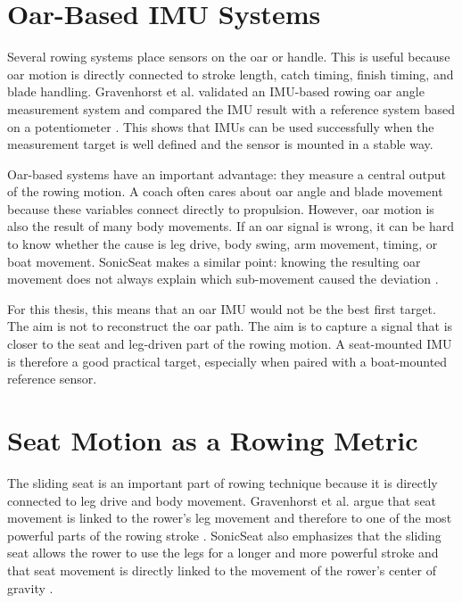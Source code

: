 \section{Oar-Based IMU Systems}

Several rowing systems place sensors on the oar or handle. This is useful because oar motion is directly connected to stroke length, catch timing, finish timing, and blade handling. Gravenhorst et al. validated an IMU-based rowing oar angle measurement system and compared the IMU result with a reference system based on a potentiometer \cite{gravenhorst_validation_2013}. This shows that IMUs can be used successfully when the measurement target is well defined and the sensor is mounted in a stable way.

Oar-based systems have an important advantage: they measure a central output of the rowing motion. A coach often cares about oar angle and blade movement because these variables connect directly to propulsion. However, oar motion is also the result of many body movements. If an oar signal is wrong, it can be hard to know whether the cause is leg drive, body swing, arm movement, timing, or boat movement. SonicSeat makes a similar point: knowing the resulting oar movement does not always explain which sub-movement caused the deviation \cite{gravenhorst_sonicseat_2012}.

For this thesis, this means that an oar IMU would not be the best first target. The aim is not to reconstruct the oar path. The aim is to capture a signal that is closer to the seat and leg-driven part of the rowing motion. A seat-mounted IMU is therefore a good practical target, especially when paired with a boat-mounted reference sensor.

\section{Seat Motion as a Rowing Metric}

The sliding seat is an important part of rowing technique because it is directly connected to leg drive and body movement. Gravenhorst et al. argue that seat movement is linked to the rower's leg movement and therefore to one of the most powerful parts of the rowing stroke \cite{gravenhorst_self-aligning_2012}. SonicSeat also emphasizes that the sliding seat allows the rower to use the legs for a longer and more powerful stroke and that seat movement is directly linked to the movement of the rower's center of gravity \cite{gravenhorst_sonicseat_2012}.


